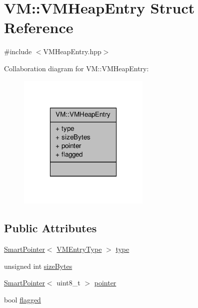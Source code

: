 \hypertarget{struct_v_m_1_1_v_m_heap_entry}{\section{V\-M\-:\-:V\-M\-Heap\-Entry Struct Reference}
\label{struct_v_m_1_1_v_m_heap_entry}
}


{\ttfamily \#include $<$V\-M\-Heap\-Entry.\-hpp$>$}



Collaboration diagram for V\-M\-:\-:V\-M\-Heap\-Entry\-:
\nopagebreak
\begin{figure}[H]
\begin{center}
\leavevmode
\includegraphics[width=178pt]{struct_v_m_1_1_v_m_heap_entry__coll__graph}
\end{center}
\end{figure}
\subsection*{Public Attributes}
\begin{DoxyCompactItemize}
\item 
\hyperlink{_smart_pointer_8hpp_afdd8d4ba81c3fcbdeacf1dafba2accfb}{Smart\-Pointer}$<$ \hyperlink{class_v_m_1_1_v_m_entry_type}{V\-M\-Entry\-Type} $>$ \hyperlink{struct_v_m_1_1_v_m_heap_entry_a8f26d4d459965e613e8d16834fefb0fb}{type}
\item 
unsigned int \hyperlink{struct_v_m_1_1_v_m_heap_entry_add1ede23c9111ec87cdaa0d4376c9705}{size\-Bytes}
\item 
\hyperlink{_smart_pointer_8hpp_afdd8d4ba81c3fcbdeacf1dafba2accfb}{Smart\-Pointer}$<$ uint8\-\_\-t $>$ \hyperlink{struct_v_m_1_1_v_m_heap_entry_a72120cd58ce16845b5e42c1085d9ed7e}{pointer}
\item 
bool \hyperlink{struct_v_m_1_1_v_m_heap_entry_add28c938f66af42411e53299d4254742}{flagged}
\end{DoxyCompactItemize}


